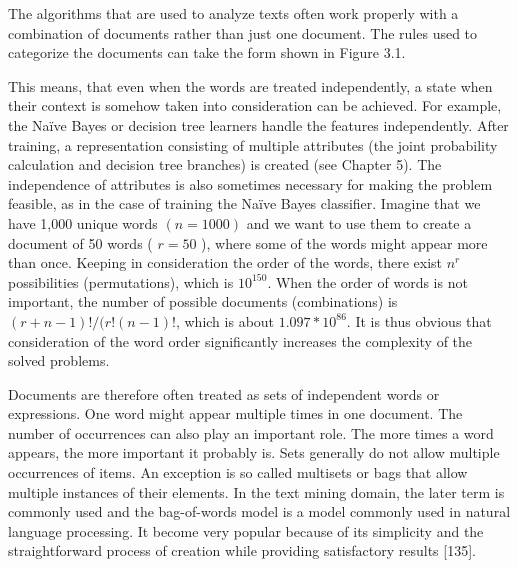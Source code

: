 \documentclass[11pt,openany,executivepaper]{book}
\begin{document}
The algorithms that are used to analyze texts often work properly with a combination of documents rather than just one document. The rules used to categorize the documents can take the form shown in Figure 3.1.

This means, that even when the words are treated independently, a state when their context is somehow taken into consideration can be achieved. For example, the Naïve Bayes or decision tree learners handle the features independently. After training, a representation consisting of multiple attributes (the joint probability calculation and decision tree branches) is created (see Chapter 5). The independence of attributes is also sometimes necessary for making the problem feasible, as in the case of training the Naïve Bayes classifier. Imagine that we have 1,000 unique words $(n=1000)$ and we want to use them to create a document of 50 words ( $r=50$ ), where some of the words might appear more than once. Keeping in consideration the order of the words, there exist $n^{r}$ possibilities (permutations), which is $10^{150}$. When the order of words is not important, the number of possible documents (combinations) is $(r+n-1)!/(r!(n-1)!$, which is about $1.097 * 10^{86}$. It is thus obvious that consideration of the word order significantly increases the complexity of the solved problems.

Documents are therefore often treated as sets of independent words or expressions. One word might appear multiple times in one document. The number of occurrences can also play an important role. The more times a word appears, the more important it probably is. Sets generally do not allow multiple occurrences of items. An exception is so called multisets or bags that allow multiple instances of their elements. In the text mining domain, the later term is commonly used and the bag-of-words model is a model commonly used in natural language processing. It become very popular because of its simplicity and the straightforward process of creation while providing satisfactory results [135].
\end{document}
